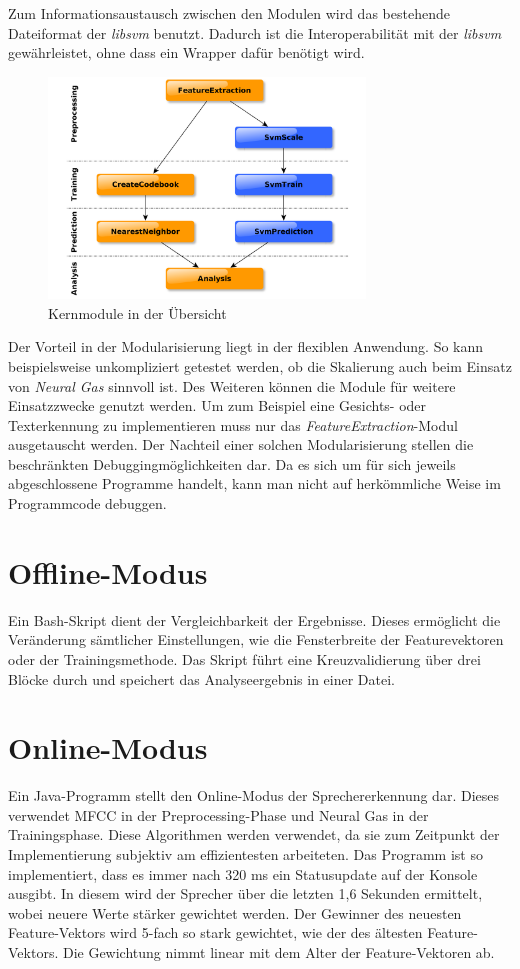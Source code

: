 Zum Informationsaustausch zwischen den Modulen wird das bestehende Dateiformat der \emph{libsvm} benutzt. Dadurch ist die Interoperabilität mit der \emph{libsvm} gewährleistet, ohne dass ein Wrapper dafür benötigt wird.

\begin{figure}[h]
  \centering
  \includegraphics[width=0.75\textwidth]{images/moduluebersicht}
  \caption{Kernmodule in der Übersicht}
  \label{fig:moduluebersicht}
\end{figure}

Der Vorteil in der Modularisierung liegt in der flexiblen Anwendung. So kann beispielsweise unkompliziert getestet werden, ob die Skalierung auch beim Einsatz von \emph{Neural Gas} sinnvoll ist. Des Weiteren können die Module für weitere Einsatzzwecke genutzt werden. Um zum Beispiel eine Gesichts- oder Texterkennung zu implementieren muss nur das \emph{FeatureExtraction}-Modul ausgetauscht werden. Der Nachteil einer solchen Modularisierung stellen die beschränkten Debuggingmöglichkeiten dar. Da es sich um für sich jeweils abgeschlossene Programme handelt, kann man nicht auf herkömmliche Weise im Programmcode debuggen.

\section{Offline-Modus}
Ein Bash-Skript dient der Vergleichbarkeit der Ergebnisse. Dieses ermöglicht die Veränderung sämtlicher Einstellungen, wie die Fensterbreite der Featurevektoren oder der Trainingsmethode. Das Skript führt eine Kreuzvalidierung über drei Blöcke durch und speichert das Analyseergebnis in einer Datei.

\section{Online-Modus}
Ein Java-Programm stellt den Online-Modus der Sprechererkennung dar. Dieses verwendet MFCC in der Preprocessing-Phase und Neural Gas in der Trainingsphase. Diese Algorithmen werden verwendet, da sie zum Zeitpunkt der Implementierung subjektiv am effizientesten arbeiteten. Das Programm ist so implementiert, dass es immer nach 320 ms ein Statusupdate auf der Konsole ausgibt. In diesem wird der Sprecher über die letzten 1,6 Sekunden ermittelt, wobei neuere Werte stärker gewichtet werden. Der Gewinner des neuesten Feature-Vektors wird 5-fach so stark gewichtet, wie der des ältesten Feature-Vektors. Die Gewichtung nimmt linear mit dem Alter der Feature-Vektoren ab.

